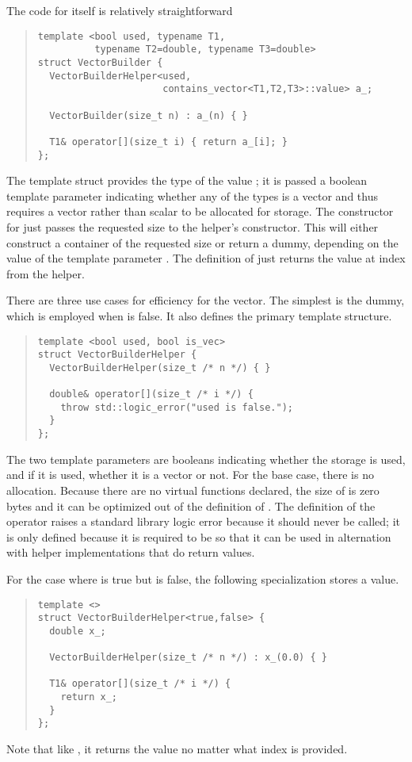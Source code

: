 \documentclass[10pt]{article}
\begin{document}
The code for  itself is relatively straightforward
%
\begin{quote}
\begin{Verbatim}
template <bool used, typename T1, 
          typename T2=double, typename T3=double>
struct VectorBuilder {
  VectorBuilderHelper<used,
                      contains_vector<T1,T2,T3>::value> a_;

  VectorBuilder(size_t n) : a_(n) { }

  T1& operator[](size_t i) { return a_[i]; }
};
\end{Verbatim}
\end{quote}
%
The template struct  provides the type of
the value ; it is passed a boolean template parameter
indicating whether any of the types is a vector and thus requires a
vector rather than scalar to be allocated for storage.  The constructor for
 just passes the requested size to the helper's
constructor.  This will either construct a container of the requested
size or return a dummy, depending on the value of the template
parameter .  The definition of  just
returns the value at index  from the helper.

There are three use cases for efficiency for the vector.  The simplest
is the dummy, which is employed when  is false.  It also
defines the primary template structure.
%
\begin{quote}
\begin{Verbatim}
template <bool used, bool is_vec>
struct VectorBuilderHelper {
  VectorBuilderHelper(size_t /* n */) { }

  double& operator[](size_t /* i */) {
    throw std::logic_error("used is false.");
  }
};
\end{Verbatim}
\end{quote}
%
The two template parameters are booleans indicating whether the
storage is used, and if it is used, whether it is a vector or not.
For the base case, there is no allocation.  Because there are no
virtual functions declared, the size of  is
zero bytes and it can be optimized out of the definition of
.  The definition of the operator raises a
standard library logic error because it should never be called;  it is
only defined because it is required to be so that it can be used in
alternation with helper implementations that do return values.

For the case where  is true but  is false,
the following specialization stores a  value.
%
\begin{quote}
\begin{Verbatim}
template <>
struct VectorBuilderHelper<true,false> {
  double x_;

  VectorBuilderHelper(size_t /* n */) : x_(0.0) { }

  T1& operator[](size_t /* i */) {
    return x_;
  }
};
\end{Verbatim}
\end{quote}
%
Note that like , it returns the value  no
matter what index is provided.
\end{document}
